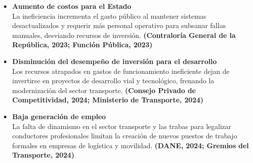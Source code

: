 \begin{itemize}
\item \textbf{Aumento de costos para el Estado} \\
La ineficiencia incrementa el gasto público al mantener sistemas desactualizados y requerir más personal operativo para subsanar fallas manuales, desviando recursos de inversión.  
\textbf{(Contraloría General de la República, 2023; Función Pública, 2023)}

\item \textbf{Disminución del desempeño de inversión para el desarrollo} \\
Los recursos atrapados en gastos de funcionamiento ineficiente dejan de invertirse en proyectos de desarrollo vial y tecnológico, frenando la modernización del sector transporte.  
\textbf{(Consejo Privado de Competitividad, 2024; Ministerio de Transporte, 2024)}

\item \textbf{Baja generación de empleo} \\
La falta de dinamismo en el sector transporte y las trabas para legalizar conductores profesionales limitan la creación de nuevos puestos de trabajo formales en empresas de logística y movilidad.  
\textbf{(DANE, 2024; Gremios del Transporte, 2024)}

\end{itemize}